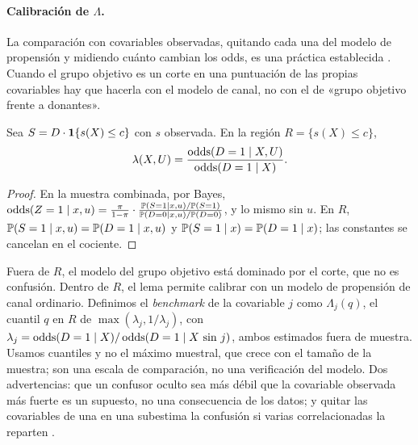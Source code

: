 \paragraph{Calibración de $\Lambda$.} La comparación con covariables observadas, quitando cada una del modelo de propensión y midiendo cuánto cambian los odds, es una práctica establecida \citep{mcclean2024,baitairian2025}. Cuando el grupo objetivo es un corte en una puntuación de las propias covariables hay que hacerla con el modelo de canal, no con el de «grupo objetivo frente a donantes».

\begin{lema}\label{lem:calibracion}
Sea $S=D\cdot\mathbf{1}\{s(X)\le c\}$ con $s$ observada. En la región $R=\{s(X)\le c\}$,
\[
\lambda(X,U)=\frac{\operatorname{odds}(D=1\mid X,U)}{\operatorname{odds}(D=1\mid X)}.
\]
\end{lema}
\begin{proof}
En la muestra combinada, por Bayes, $\operatorname{odds}(Z=1\mid x,u)=\frac{\pi}{1-\pi}\cdot\frac{\mathbb{P}(S=1\mid x,u)/\mathbb{P}(S=1)}{\mathbb{P}(D=0\mid x,u)/\mathbb{P}(D=0)}$, y lo mismo sin $u$. En $R$, $\mathbb{P}(S=1\mid x,u)=\mathbb{P}(D=1\mid x,u)$ y $\mathbb{P}(S=1\mid x)=\mathbb{P}(D=1\mid x)$; las constantes se cancelan en el cociente.
\end{proof}

Fuera de $R$, el modelo del grupo objetivo está dominado por el corte, que no es confusión. Dentro de $R$, el lema permite calibrar con un modelo de propensión de canal ordinario. Definimos el \emph{benchmark} de la covariable $j$ como $\Lambda_j(q)$, el cuantil $q$ en $R$ de $\max(\lambda_j,1/\lambda_j)$, con $\lambda_j=\operatorname{odds}(D=1\mid X)/\operatorname{odds}(D=1\mid X\text{ sin }j)$, ambos estimados fuera de muestra. Usamos cuantiles y no el máximo muestral, que crece con el tamaño de la muestra; son una escala de comparación, no una verificación del modelo. Dos advertencias: que un confusor oculto sea más débil que la covariable observada más fuerte es un supuesto, no una consecuencia de los datos; y quitar las covariables de una en una subestima la confusión si varias correlacionadas la reparten \citep{mcclean2024}.
